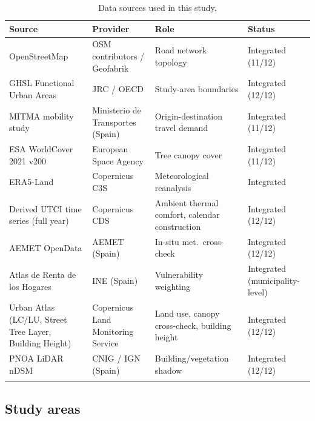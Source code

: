 \documentclass[pdflatex,sn-mathphys-ay]{sn-jnl}
\begin{document}
\begin{table}[h]
\caption{Data sources used in this study.}
\label{tab:data_sources}
\begin{tabular}{@{}p{2.6cm}p{3.3cm}p{3.6cm}p{1.6cm}@{}}
\toprule
Source & Provider & Role & Status \\
\midrule
OpenStreetMap & OSM contributors / Geofabrik & Road network topology & Integrated (11/12) \\
GHSL Functional Urban Areas & JRC / OECD & Study-area boundaries & Integrated (12/12) \\
MITMA mobility study & Ministerio de Transportes (Spain) & Origin-destination travel demand & Integrated (11/12) \\
ESA WorldCover 2021 v200 & European Space Agency & Tree canopy cover & Integrated (11/12) \\
ERA5-Land & Copernicus C3S & Meteorological reanalysis & Integrated \\
Derived UTCI time series (full year) & Copernicus CDS & Ambient thermal comfort, calendar construction & Integrated (12/12) \\
AEMET OpenData & AEMET (Spain) & In-situ met.\ cross-check & Integrated (12/12) \\
Atlas de Renta de los Hogares & INE (Spain) & Vulnerability weighting & Integrated (municipality-level) \\
Urban Atlas (LC/LU, Street Tree Layer, Building Height) & Copernicus Land Monitoring Service & Land use, canopy cross-check, building height & Integrated (12/12) \\
PNOA LiDAR nDSM & CNIG / IGN (Spain) & Building/vegetation shadow & Integrated (12/12) \\
\botrule
\end{tabular}
\end{table}

\subsection{Study areas}
\label{sec:study_areas}
\end{document}
